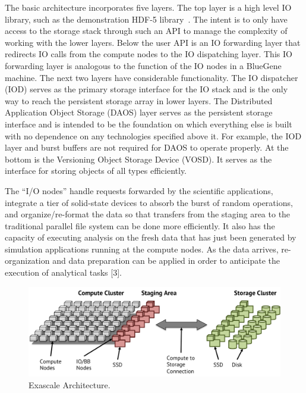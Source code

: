 \documentclass[conference]{IEEEtran}
\begin{document}
The basic architecture incorporates five layers. The top layer is a high level
IO library, such as the demonstration HDF-5 library~\cite{hdf5}. The intent is
to only have access to the storage stack through such an API to manage the
complexity of working with the lower layers. Below the user API is an IO
forwarding layer that redirects IO calls from the compute nodes to the IO
dispatching layer.  This IO forwarding layer is analogous to the function of
the IO nodes in a BlueGene machine. The next two layers have considerable
functionality. The IO dispatcher (IOD) serves as the primary storage interface
for the IO stack and is the only way to reach the persistent storage array in
lower layers. The Distributed Application Object Storage (DAOS) layer serves as
the persistent storage interface and is intended to be the foundation on which
everything else is built with no dependence on any technologies specified above
it. For example, the IOD layer and burst buffers are not required for DAOS to
operate properly. At the bottom is the Versioning Object Storage Device (VOSD).
It serves as the interface for storing objects of all types efficiently.


The ``I/O nodes'' handle 
requests forwarded by the scientific applications, integrate a tier of
solid-state devices to absorb the burst of random operations, and
organize/re-format the data so that transfers from the staging area to
the traditional parallel file system can be done more efficiently. It
also has the capacity of executing analysis on the fresh data that has
just been generated by simulation applications running at the compute
nodes. As the data arrives, re-organization and data preparation can be
applied in order to anticipate the execution of analytical tasks
{[}3{]}.

\begin{figure}[htbp]
\centering
\includegraphics[scale=0.30]{images/exa-arch.png}
\caption{Exascale Architecture. \label{exa-arch}}
\end{figure}
\end{document}
